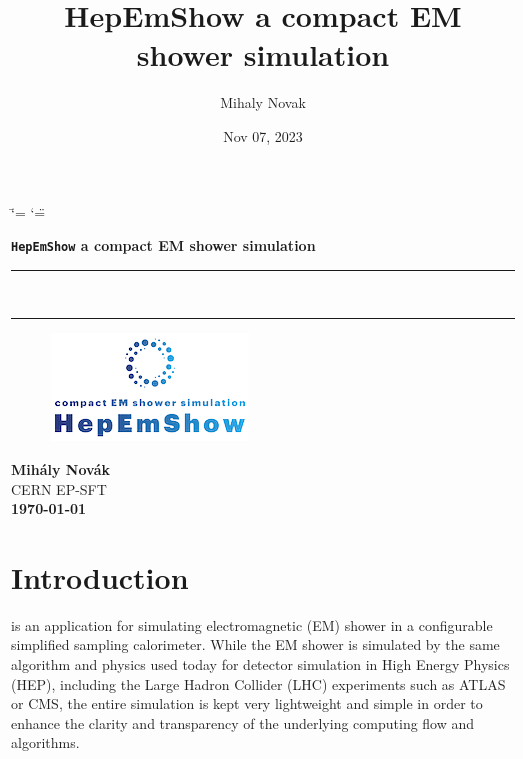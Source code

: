 \documentclass[letterpaper,10pt,english]{sphinxmanual}
\title{HepEmShow a compact EM shower simulation}
\date{Nov 07, 2023}
\author{Mihaly Novak}
\begin{document}
\ifdefined\shorthandoff
  \ifnum\catcode`\=\string=\active\shorthandoff{=}\fi
  \ifnum\catcode`\"=\active{}\fi
\fi

\pagestyle{empty}

     \begin{titlepage}
       \vspace*{30mm}
       \textbf{\Huge {\texttt{HepEmShow} a compact EM shower simulation}}
       \rule{1.0\linewidth}{2.4pt}\\[-3.7ex] \rule{1.0\linewidth}{0.6pt}
          \vspace*{20mm}
          \begin{figure}[!h]
             \centering
             \includegraphics[scale=1.1]{logo_HepEmShow.png}
          \end{figure}
       \vfill
       \vspace*{-50mm}
       \centering
       \Large \textbf{Mih{\'a}ly Nov{\'a}k}\\ CERN EP-SFT\\
       \vspace*{30mm}
       \small \textbf{\today}
    \end{titlepage}

\pagestyle{plain}
\sphinxtableofcontents
\pagestyle{normal}
\label{\detokenize{index::doc}}


\sphinxstepscope


\chapter{Introduction}
\label{\detokenize{IntroAndInstall/introduction:introduction}}\label{\detokenize{IntroAndInstall/introduction:introduction-doc}}\label{\detokenize{IntroAndInstall/introduction::doc}}
\sphinxAtStartPar
{} is an application for simulating electromagnetic (EM) shower in a configurable simplified sampling calorimeter.
While the EM shower is simulated by the same algorithm and physics used today for detector simulation in High Energy Physics (HEP),
including the Large Hadron Collider (LHC) experiments such as ATLAS or CMS, the entire simulation is kept very lightweight and simple
in order to enhance the clarity and transparency of the underlying computing flow and algorithms.
\end{document}
